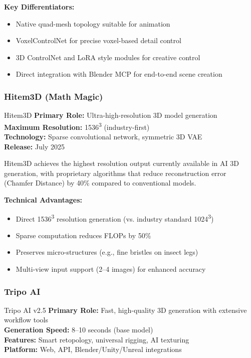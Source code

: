 \documentclass[11pt]{article}
\begin{document}
\textbf{Key Differentiators:}
\begin{itemize}[leftmargin=2em]
  \item Native quad-mesh topology suitable for animation
  \item VoxelControlNet for precise voxel-based detail control
  \item 3D ControlNet and LoRA style modules for creative control
  \item Direct integration with Blender MCP for end-to-end scene creation
\end{itemize}

\subsubsection{Hitem3D (Math Magic)}

\begin{toolbox}{Hitem3D}
\textbf{Primary Role:} Ultra-high-resolution 3D model generation\\
\textbf{Maximum Resolution:} 1536\textsuperscript{3} (industry-first)\\
\textbf{Technology:} Sparse convolutional network, symmetric 3D VAE\\
\textbf{Release:} July 2025
\end{toolbox}

Hitem3D achieves the highest resolution output currently available in AI 3D generation, with proprietary algorithms that reduce reconstruction error (Chamfer Distance) by 40\% compared to conventional models.

\textbf{Technical Advantages:}
\begin{itemize}[leftmargin=2em]
  \item Direct 1536\textsuperscript{3} resolution generation (vs. industry standard 1024\textsuperscript{3})
  \item Sparse computation reduces FLOPs by 50\%
  \item Preserves micro-structures (e.g., fine bristles on insect legs)
  \item Multi-view input support (2--4 images) for enhanced accuracy
\end{itemize}

\subsubsection{Tripo AI}

\begin{toolbox}{Tripo AI v2.5}
\textbf{Primary Role:} Fast, high-quality 3D generation with extensive workflow tools\\
\textbf{Generation Speed:} 8--10 seconds (base model)\\
\textbf{Features:} Smart retopology, universal rigging, AI texturing\\
\textbf{Platform:} Web, API, Blender/Unity/Unreal integrations
\end{toolbox}
\end{document}

